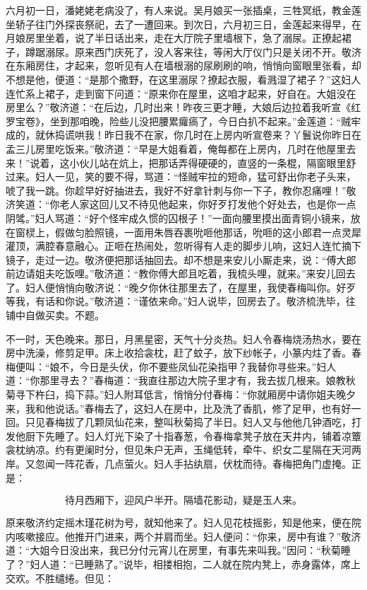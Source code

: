 六月初一日，潘姥姥老病没了，有人来说。吴月娘买一张插桌，三牲冥纸，教金莲坐轿子往门外探丧祭祀，去了一遭回来。到次日，六月初三日，金莲起来得早，在月娘房里坐着，说了半日话出来，走在大厅院子里墙根下，急了溺尿。正撩起裙子，蹲踞溺尿。原来西门庆死了，没人客来往，等闲大厅仪门只是关闭不开。敬济在东厢房住，才起来，忽听见有人在墙根溺的尿刷刷的响，悄悄向窗眼里张看，却不想是他，便道：“是那个撒野，在这里溺尿？撩起衣服，看溅湿了裙子？”这妇人连忙系上裙子，走到窗下问道：“原来你在屋里，这咱才起来，好自在。大姐没在房里么？”敬济道：“在后边，几时出来！昨夜三更才睡，大娘后边拉着我听宣《红罗宝卷》，坐到那咱晚，险些儿没把腰累㿚瘑了，今日白扒不起来。”金莲道：“贼牢成的，就休捣谎哄我！昨日我不在家，你几时在上房内听宣卷来？丫鬟说你昨日在孟三儿房里吃饭来。”敬济道：“早是大姐看着，俺每都在上房内，几时在他屋里去来！”说着，这小伙儿站在炕上，把那话弄得硬硬的，直竖的一条棍，隔窗眼里舒过来。妇人一见，笑的要不得，骂道：“怪贼牢拉的短命，猛可舒出你老子头来，唬了我一跳。你趁早好好抽进去，我好不好拿针刺与你一下子，教你忍痛哩！”敬济笑道：“你老人家这回儿又不待见他起来，你好歹打发他个好处去，也是你一点阴骘。”妇人骂道：“好个怪牢成久惯的囚根子！”一面向腰里摸出面青铜小镜来，放在窗棂上，假做匀脸照镜，一面用朱唇吞裹吮咂他那话，吮咂的这小郎君一点灵犀灌顶，满腔春意融心。正咂在热闹处，忽听得有人走的脚步儿响，这妇人连忙摘下镜子，走过一边。敬济便把那话抽回去。却不想是来安儿小厮走来，说：“傅大郎前边请姐夫吃饭哩。”敬济道：“教你傅大郎且吃着，我梳头哩，就来。”来安儿回去了。妇人便悄悄向敬济说：“晚夕你休往那里去了，在屋里，我使春梅叫你。好歹等我，有话和你说。”敬济道：“谨依来命。”妇人说毕，回房去了。敬济梳洗毕，往铺中自做买卖。不题。

不一时，天色晚来。那日，月黑星密，天气十分炎热。妇人令春梅烧汤热水，要在房中洗澡，修剪足甲。床上收拾衾枕，赶了蚊子，放下纱帐子，小篆内炷了香。春梅便叫：“娘不，今日是头伏，你不要些凤仙花染指甲？我替你寻些来。”妇人道：“你那里寻去？”春梅道：“我直往那边大院子里才有，我去拔几根来。娘教秋菊寻下杵臼，捣下蒜。”妇人附耳低言，悄悄分付春梅：“你就厢房中请你姐夫晚夕来，我和他说话。”春梅去了，这妇人在房中，比及洗了香肌，修了足甲，也有好一回。只见春梅拔了几颗凤仙花来，整叫秋菊捣了半日。妇人又与他他几钟酒吃，打发他厨下先睡了。妇人灯光下染了十指春葱，令春梅拿凳子放在天井内，铺着凉簟衾枕纳凉。约有更阑时分，但见朱户无声，玉绳低转，牵牛、织女二星隔在天河两岸。又忽闻一阵花香，几点萤火。妇人手拈纨扇，伏枕而待。春梅把角门虚掩。正是：

\[
待月西厢下，迎风户半开。
隔墙花影动，疑是玉人来。
\]

原来敬济约定摇木瑾花树为号，就知他来了。妇人见花枝摇影，知是他来，便在院内咳嗽接应。他推开门进来，两个并肩而坐。妇人便问：“你来，房中有谁？”敬济道：“大姐今日没出来，我已分付元宵儿在房里，有事先来叫我。”因问：“秋菊睡了？”妇人道：“已睡熟了。”说毕，相搂相抱，二人就在院内凳上，赤身露体，席上交欢。不胜缱绻。但见：

